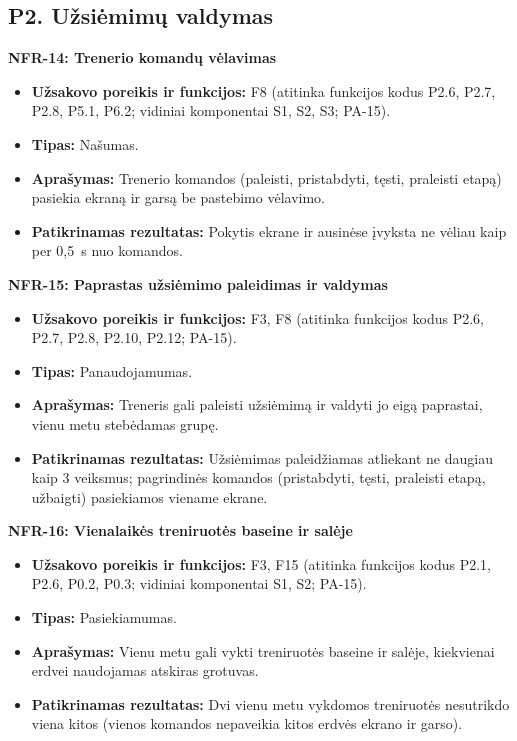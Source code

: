 \subsection{P2. Užsiėmimų valdymas}

\noindent\textbf{NFR-14: Trenerio komandų vėlavimas}
\begin{itemize}
    \item \textbf{Užsakovo poreikis ir funkcijos:} F8 (atitinka funkcijos kodus P2.6, P2.7, P2.8, P5.1, P6.2; vidiniai komponentai S1, S2, S3; PA-15).
    \item \textbf{Tipas:} Našumas.
    \item \textbf{Aprašymas:} Trenerio komandos (paleisti, pristabdyti, tęsti, praleisti etapą) pasiekia ekraną ir garsą be pastebimo vėlavimo.
    \item \textbf{Patikrinamas rezultatas:} Pokytis ekrane ir ausinėse įvyksta ne vėliau kaip per 0,5~s nuo komandos.
\end{itemize}

\noindent\textbf{NFR-15: Paprastas užsiėmimo paleidimas ir valdymas}
\begin{itemize}
    \item \textbf{Užsakovo poreikis ir funkcijos:} F3, F8 (atitinka funkcijos kodus P2.6, P2.7, P2.8, P2.10, P2.12; PA-15).
    \item \textbf{Tipas:} Panaudojamumas.
    \item \textbf{Aprašymas:} Treneris gali paleisti užsiėmimą ir valdyti jo eigą paprastai, vienu metu stebėdamas grupę.
    \item \textbf{Patikrinamas rezultatas:} Užsiėmimas paleidžiamas atliekant ne daugiau kaip 3 veiksmus; pagrindinės komandos (pristabdyti, tęsti, praleisti etapą, užbaigti) pasiekiamos viename ekrane.
\end{itemize}

\noindent\textbf{NFR-16: Vienalaikės treniruotės baseine ir salėje}
\begin{itemize}
    \item \textbf{Užsakovo poreikis ir funkcijos:} F3, F15 (atitinka funkcijos kodus P2.1, P2.6, P0.2, P0.3; vidiniai komponentai S1, S2; PA-15).
    \item \textbf{Tipas:} Pasiekiamumas.
    \item \textbf{Aprašymas:} Vienu metu gali vykti treniruotės baseine ir salėje, kiekvienai erdvei naudojamas atskiras grotuvas.
    \item \textbf{Patikrinamas rezultatas:} Dvi vienu metu vykdomos treniruotės nesutrikdo viena kitos (vienos komandos nepaveikia kitos erdvės ekrano ir garso).
\end{itemize}

